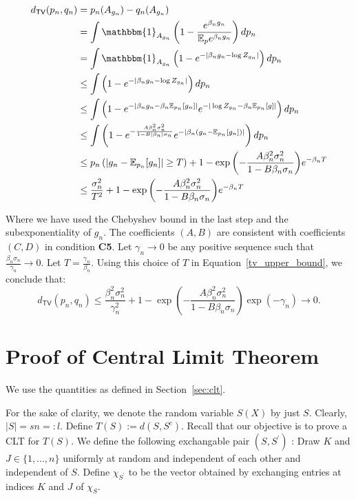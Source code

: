 \documentclass[final,12pt]{colt2018}
\begin{document}
\begin{align}
d_{\mathsf{TV}}(p_n,q_n ) &= p_n(A_{g_n}) - q_n(A_{g_n})\nonumber\\
&= \int \mathbbm{1}_{A_{g_n}}\left(1-\frac{e^{\beta_ng_n}}{\mathbb{E}_pe^{\beta_n g_n}}\right)dp_n \nonumber \\
&= \int \mathbbm{1}_{A_{g_n}} \left( 1- e^{-|\beta_n g_n - \log{Z_{g_n}}|}\right)dp_n \nonumber \\
&\leq \int \left( 1- e^{-|\beta_n g_n - \log{Z_{g_n}}|}\right) dp_n\nonumber\\
&\leq \int \left(1 - e^{-|\beta_n g_n - \beta_n\mathbb{E}_{p_n}[g_n]|}e^{-|\log{Z_{g_n}} - \beta_n \mathbb{E}_{p_n}[g]|}\right)dp_n\nonumber\\
&\leq \int \left( 1 - e^{- \frac{A\beta_n^2 \sigma_n^2}{1-B|\beta_n| \sigma_n}}e^{-|\beta_n(g_n - \mathbb{E}_{p_n}[g_n])|}\right)dp_n \nonumber\\
&\leq p_n\left(|g_n - \mathbb{E}_{p_n}[g_n]|\geq T\right) + 1-\exp{\left(- \frac{A\beta_n^2 \sigma_n^2}{1-B\beta_n \sigma_n}\right)}e^{-\beta_nT} \nonumber\\
&\leq \frac{\sigma_n^2}{T^2} + 1-\exp{\left(- \frac{A\beta_n^2 \sigma_n^2}{1-B\beta_n \sigma_n}\right)}e^{-\beta_nT}\label{tv_upper_bound}
\end{align}

Where we have used the Chebyshev bound in the last step and the subexponentiality of $g_n$. The coefficients $(A,B)$ are consistent with coefficients $(C,D)$ in condition \textbf{C5}. Let $\gamma_n \to 0$ be any positive sequence such that $\frac{\beta_n\sigma_n}{\gamma_n} \to 0$. Let $T = \frac{\gamma_n}{\beta_n}$. Using this choice of $T$ in Equation~\eqref{tv_upper_bound}, we conclude that:
$$d_{\mathsf{TV}}(p_n,q_n) \leq \frac{\beta_n^2\sigma_n^2}{\gamma_n^2} + 1- \exp{\left(- \frac{A\beta_n^2 \sigma_n^2}{1-B\beta_n \sigma_n}\right)}\exp{\left(-\gamma_n\right)} \to 0.$$




\section{Proof of Central Limit Theorem}


We use the quantities as defined in Section~\ref{sec:clt}.


For the sake of clarity, we denote the random variable $S(X)$ by just $S$. Clearly, $|S| = sn =: l$. Define $T(S):= d(S,S^c)$. Recall that our objective is to prove a CLT for $T(S)$. 
We define the following exchangable pair $(S,S^{\prime})$ :
Draw $K$ and $J \in \{1,...,n\}$ uniformly at random and independent of each other and independent of $S$. Define $\chi_{S^{\prime}}$ to be the vector obtained by exchanging entries at indices $K$ and $J$ of $\chi_S$. 
\end{document}
